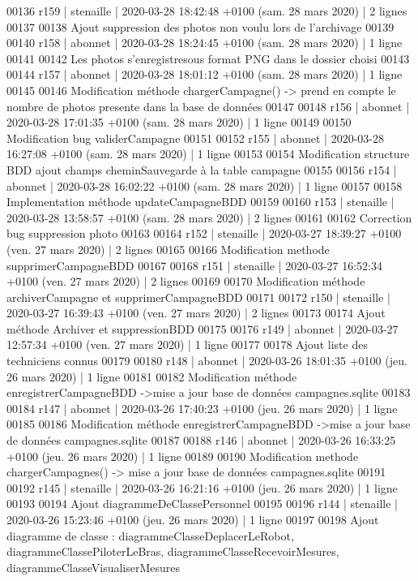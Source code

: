 \begin{DoxyCode}
00136 r159 | stenaille | 2020-03-28 18:42:48 +0100 (sam. 28 mars 2020) | 2 lignes
00137 
00138 Ajout suppression des photos non voulu lors de l'archivage
00139 
00140 r158 | abonnet | 2020-03-28 18:24:45 +0100 (sam. 28 mars 2020) | 1 ligne
00141 
00142 Les photos s'enregistresous format PNG dans le dossier choisi
00143 
00144 r157 | abonnet | 2020-03-28 18:01:12 +0100 (sam. 28 mars 2020) | 1 ligne
00145 
00146 Modification méthode chargerCampagne() -> prend en compte le nombre de photos presente dans la base de
       données
00147 
00148 r156 | abonnet | 2020-03-28 17:01:35 +0100 (sam. 28 mars 2020) | 1 ligne
00149 
00150 Modification bug validerCampagne
00151 
00152 r155 | abonnet | 2020-03-28 16:27:08 +0100 (sam. 28 mars 2020) | 1 ligne
00153 
00154 Modification structure BDD ajout champs cheminSauvegarde à la table campagne
00155 
00156 r154 | abonnet | 2020-03-28 16:02:22 +0100 (sam. 28 mars 2020) | 1 ligne
00157 
00158 Implementation méthode updateCampagneBDD
00159 
00160 r153 | stenaille | 2020-03-28 13:58:57 +0100 (sam. 28 mars 2020) | 2 lignes
00161 
00162 Correction bug suppression photo
00163 
00164 r152 | stenaille | 2020-03-27 18:39:27 +0100 (ven. 27 mars 2020) | 2 lignes
00165 
00166 Modification methode supprimerCampagneBDD
00167 
00168 r151 | stenaille | 2020-03-27 16:52:34 +0100 (ven. 27 mars 2020) | 2 lignes
00169 
00170 Modification méthode archiverCampagne et supprimerCampagneBDD
00171 
00172 r150 | stenaille | 2020-03-27 16:39:43 +0100 (ven. 27 mars 2020) | 2 lignes
00173 
00174 Ajout méthode Archiver et suppressionBDD
00175 
00176 r149 | abonnet | 2020-03-27 12:57:34 +0100 (ven. 27 mars 2020) | 1 ligne
00177 
00178 Ajout liste des techniciens connus
00179 
00180 r148 | abonnet | 2020-03-26 18:01:35 +0100 (jeu. 26 mars 2020) | 1 ligne
00181 
00182 Modification méthode enregistrerCampagneBDD ->mise a jour base de données campagnes.sqlite
00183 
00184 r147 | abonnet | 2020-03-26 17:40:23 +0100 (jeu. 26 mars 2020) | 1 ligne
00185 
00186 Modification méthode enregistrerCampagneBDD ->mise a jour base de données campagnes.sqlite
00187 
00188 r146 | abonnet | 2020-03-26 16:33:25 +0100 (jeu. 26 mars 2020) | 1 ligne
00189 
00190 Modification methode chargerCampagnes() -> mise a jour base de données campagnes.sqlite
00191 
00192 r145 | stenaille | 2020-03-26 16:21:16 +0100 (jeu. 26 mars 2020) | 1 ligne
00193 
00194 Ajout diagrammeDeClassePersonnel
00195 
00196 r144 | stenaille | 2020-03-26 15:23:46 +0100 (jeu. 26 mars 2020) | 1 ligne
00197 
00198 Ajout diagramme de classe : diagrammeClasseDeplacerLeRobot, diagrammeClassePiloterLeBras,
       diagrammeClasseRecevoirMesures, diagrammeClasseVisualiserMesures

\end{DoxyCode}
